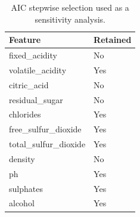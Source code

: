 \begin{table}

\caption{\label{tab:p3-stepwise-sensitivity}AIC stepwise selection used as a sensitivity analysis.}
\centering
\begin{tabular}[t]{ll}
\toprule
Feature & Retained\\
\midrule
fixed\_acidity & No\\
volatile\_acidity & Yes\\
citric\_acid & No\\
residual\_sugar & No\\
chlorides & Yes\\
\addlinespace
free\_sulfur\_dioxide & Yes\\
total\_sulfur\_dioxide & Yes\\
density & No\\
ph & Yes\\
sulphates & Yes\\
\addlinespace
alcohol & Yes\\
\bottomrule
\end{tabular}
\end{table}
